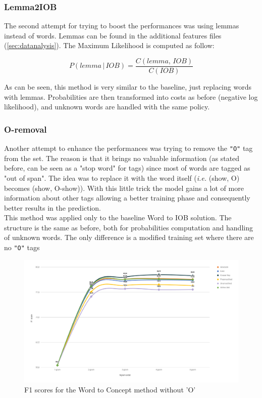 \documentclass[11pt,a4paper]{article}
\begin{document}
\subsubsection{Lemma2IOB}

The second attempt for trying to boost the performances was using lemmas instead of words. Lemmas can be found in the additional features files (\ref{sec:datanalysis}). The Maximum Likelihood is computed as follow:

\begin{equation}
\label{probl2iob}
	P(lemma\,|\,IOB)=\frac{C(lemma,\,IOB)}{C(IOB)}
\end{equation}

As can be seen, this method is very similar to the baseline, just replacing words with lemmas. Probabilities are then transformed into costs as before (negative log likelihood), and unknown words are handled with the same policy. 

\subsubsection{O-removal}

Another attempt to enhance the performances was trying to remove the {\tt "O"} tag from the set. The reason is that it brings no valuable information (as stated before, can be seen as a "stop word" for tags) since most of words are tagged as "out of span". The idea was to replace it with the word itself (\textit{i.e.} (show, O) becomes (show, O-show)). With this little trick the model gains a lot of more information about other tags allowing a better training phase and consequently better results in the prediction.\\

This method was applied only to the baseline Word to IOB solution. The structure is the same as before, both for probabilities computation and handling of unknown words. The only difference is a modified training set where there are no {\tt "O"} tags

\begin{figure}[h]
	\includegraphics[width=\textwidth]{img/chart.png}
	\caption{F1 scores for the Word to Concept method without 'O'}
\end{figure}
\end{document}
